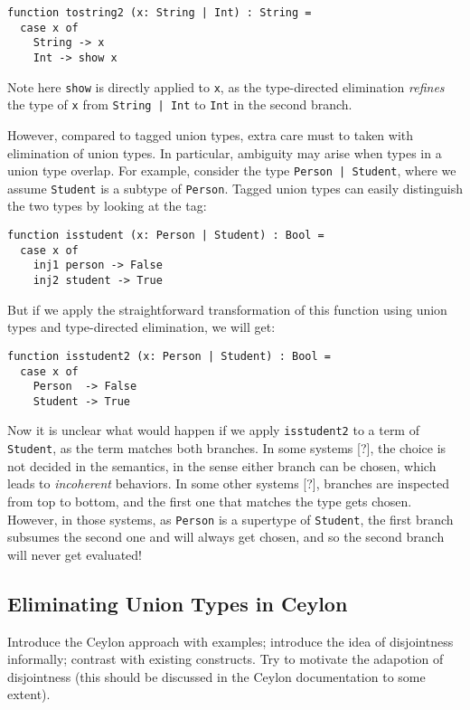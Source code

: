 \begin{lstlisting}
function tostring2 (x: String | Int) : String =
  case x of
    String -> x
    Int -> show x
\end{lstlisting}

\noindent Note here \lstinline{show} is directly applied to \lstinline{x}, as
the type-directed elimination \textit{refines} the type of \lstinline{x} from
\lstinline{String | Int} to \lstinline{Int} in the second branch.

However, compared to tagged union types, extra care must to taken with
elimination of union types. In particular, ambiguity may arise when types in a
union type overlap. For example, consider the type \lstinline{Person | Student},
where we assume \lstinline{Student} is a subtype of \lstinline{Person}. Tagged
union types can easily distinguish the two types by looking at the tag:

\begin{lstlisting}
function isstudent (x: Person | Student) : Bool =
  case x of
    inj1 person -> False
    inj2 student -> True
\end{lstlisting}

But if we apply the straightforward transformation of this function using union
types and type-directed elimination, we will get:

\begin{lstlisting}
function isstudent2 (x: Person | Student) : Bool =
  case x of
    Person  -> False
    Student -> True
\end{lstlisting}

\noindent Now it is unclear what would happen if we apply \lstinline{isstudent2}
to a term of \lstinline{Student}, as the term matches both branches. In some
systems [?], the choice is not decided in the semantics, in the sense either
branch can be chosen, which leads to \textit{incoherent} behaviors. In some
other systems [?], branches are inspected from top to bottom, and the first one
that matches the type gets chosen. However, in those systems, as
\lstinline{Person} is a supertype of \lstinline{Student}, the first branch
subsumes the second one and will always get chosen, and so the second branch
will never get evaluated!


\subsection{Eliminating Union Types in Ceylon}

Introduce the Ceylon approach with examples; introduce the idea of
disjointness informally; contrast with existing constructs.
Try to motivate the adapotion of disjointness (this should be discussed
in the Ceylon documentation to some extent).

